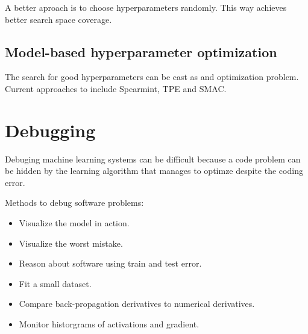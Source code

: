 \documentclass{tufte-handout}
\begin{document}
A better aproach is to choose hyperparameters randomly. This way achieves better
search space coverage.

\subsection{Model-based hyperparameter optimization}
The search for good hyperparameters can be cast as and optimization problem.
Current approaches to include Spearmint\cite{snoek-et-al-2016}, TPE
\cite{bergstar-et-al-2011} and SMAC\cite{hutter-et-al-2011}.

\section{Debugging}\label{sec:debugging}
Debuging machine learning systems can be difficult because a code problem can be
hidden by the learning algorithm that manages to optimze despite the coding error.

Methods to debug software problems:
\begin{itemize}
    \item Visualize the model in action.
    \item Visualize the worst mistake.
    \item Reason about software using train and test error.
    \item Fit a small dataset.
    \item Compare back-propagation derivatives to numerical derivatives.
    \item Monitor historgrams of activations and gradient.
\end{itemize}



\end{document}
